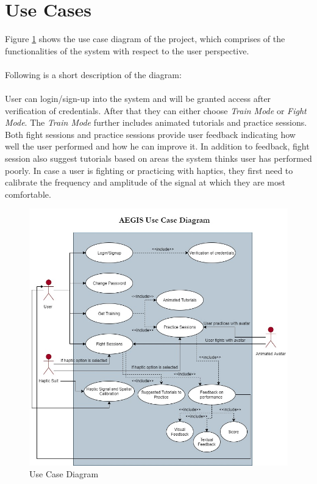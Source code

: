 \section{Use Cases}
Figure \ref{fig:usecase} shows the use case diagram of the project, which comprises of the functionalities of the system with respect to the user perspective. \\ \\ 
Following is a short description of the diagram: \\ \\
User can login/sign-up into the system and will be granted access after verification of credentials. After that they can either choose \textit{Train Mode} or \textit{Fight Mode}. The \textit{Train Mode} further includes animated tutorials and practice sessions. Both fight sessions and practice sessions provide user feedback indicating how well the user performed and how he can improve it. In addition to feedback, fight session also suggest tutorials based on areas the system thinks user has performed poorly. In case a user is fighting or practicing with haptics, they first need to calibrate the frequency and amplitude of the signal at which they are most comfortable. 
\begin{figure}[ht]
    \centering
    \includegraphics[scale=0.7]{images/UseCaseDiagram.jpg}
    \caption{Use Case Diagram}
    \label{fig:usecase}
\end{figure}

